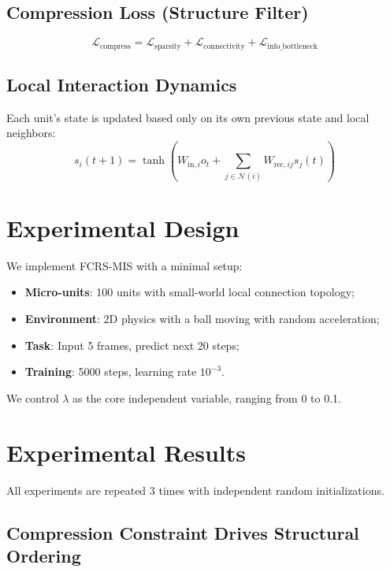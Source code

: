 \documentclass[11pt]{article}
\begin{document}
\subsection{Compression Loss (Structure Filter)}
\begin{equation}
\mathcal{L}_{\text{compress}} = \mathcal{L}_{\text{sparsity}} + \mathcal{L}_{\text{connectivity}} + \mathcal{L}_{\text{info\_bottleneck}}
\end{equation}

\subsection{Local Interaction Dynamics}
Each unit's state is updated based only on its own previous state and local neighbors:
\begin{equation}
s_i(t+1) = \tanh\left( W_{\text{in},i} o_t + \sum_{j \in \mathcal{N}(i)} W_{\text{rec},ij} s_j(t) \right)
\end{equation}

\section{Experimental Design}

We implement FCRS-MIS with a minimal setup:
\begin{itemize}
    \item \textbf{Micro-units}: 100 units with small-world local connection topology;
    \item \textbf{Environment}: 2D physics with a ball moving with random acceleration;
    \item \textbf{Task}: Input 5 frames, predict next 20 steps;
    \item \textbf{Training}: 5000 steps, learning rate $10^{-3}$.
\end{itemize}

We control $\lambda$ as the core independent variable, ranging from 0 to 0.1.

\section{Experimental Results}

All experiments are repeated 3 times with independent random initializations.

\subsection{Compression Constraint Drives Structural Ordering}
\end{document}
